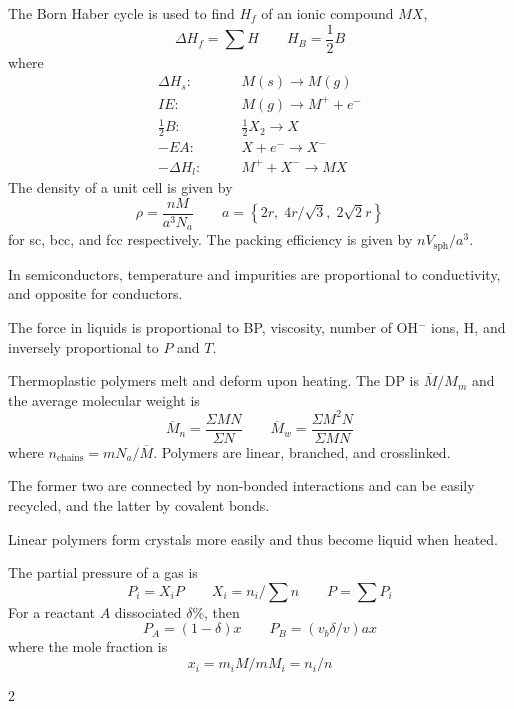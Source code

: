 \documentclass[11pt]{extarticle}
\begin{document}
\begin{multicols*}{2}
\bigskip
The Born Haber cycle is used to find $H_f$ of an ionic compound $MX$,
\begin{equation}
  \Delta H_f = \textstyle\sum H \qquad H_B = \textstyle\frac{1}{2} B
\end{equation}
where
\begin{align}
  \Delta H_s: \qquad & M(s) \to M(g) \nonumber\\
  IE: \qquad & M(g) \to M^+ + e^- \nonumber\\
  \textstyle\frac{1}{2} B: \qquad & \textstyle\frac{1}{2} X_2 \to X \\
  -EA: \qquad & X + e^- \to X^- \nonumber\\
  - \Delta H_l: \qquad & M^+ + X^- \to MX \nonumber
\end{align}
The density of a unit cell is given by
\begin{equation}
  \rho = \frac{nM}{a^3 N_a} \qquad a = \left\{ 2r, \; 4r/\sqrt 3, \; 2 \sqrt 2 r  \right\}
\end{equation}
for sc, bcc, and fcc respectively. The packing efficiency is given by $n V_{\text{sph}} / a^3$.

\bigskip
In semiconductors, temperature and impurities are proportional to conductivity, and opposite for conductors.

\bigskip
The force in liquids is proportional to BP, viscosity, number of OH$^-$ ions, H, and inversely proportional to $P$ and $T$.

\bigskip
Thermoplastic polymers melt and deform upon heating. The DP is $\overline M / M_{m}$ and the average molecular weight is
\begin{equation}
  \overline M_n = \frac{\Sigma MN}{\Sigma N} \qquad \overline M_w = \frac{\Sigma M^2 N}{\Sigma MN}
\end{equation}
where $n_\text{chains} = m N_a / \overline M$. Polymers are linear, branched, and crosslinked.

\bigskip
The former two are connected by non-bonded interactions and can be easily recycled, and the latter by covalent bonds.

\bigskip
Linear polymers form crystals more easily and thus become liquid when heated.

\bigskip
The partial pressure of a gas is
\begin{equation}
  P_i = X_i P \qquad X_i = n_i / \textstyle\sum n \qquad P = \textstyle\sum P_i
\end{equation}
For a reactant $A$ dissociated $\delta \%$, then \begin{equation}
  P_A = (1-\delta)x \qquad P_B = (v_b \delta / v)a x
\end{equation}
where the mole fraction is
\begin{equation}
  x_i = m_i M / m M_i = n_i / n
\end{equation}

\end{multicols*}{2}
\end{document}
